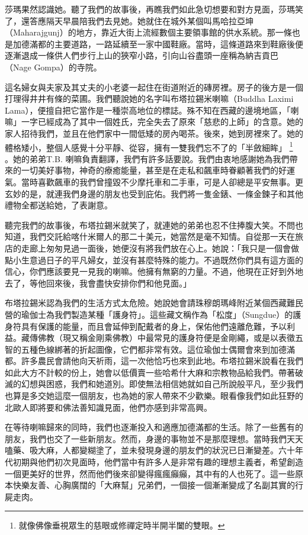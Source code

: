 莎瑪果然認識她。聽了我們的故事後，再瞧我們如此急切想要和對方見面，莎瑪笑了，還答應隔天早晨陪我們去見她。她就住在城外某個叫馬哈拉亞坤（Maharajgunj）的地方，靠近大街上流經數個主要領事館的供水系統。那一條也是加德滿都的主要道路，一路延續至一家中國鞋廠。當時，這條道路來到鞋廠後便逐漸退成一條供人們步行上山的狹窄小路，引向山谷盡頭一座稱為納吉貢巴（Nage
Gompa）的寺院。

這名婦女與夫家及其丈夫的小老婆一起住在街道附近的磚房裡。房子的後方是一個打理得井井有條的菜圃。我們聽說她的名字叫布塔拉錫米喇嘛（Buddha
Laximi
Lama），便擅自把它當作是一種崇高地位的標誌。殊不知在西藏的邊境地區，「喇嘛」一字已經成為了其中一個姓氏，完全失去了原來「慈悲的上師」的含意。她的家人招待我們，並且在他們家中一間低矮的房內喝茶。後來，她到房裡來了。她的體格矮小，整個人感覺十分平靜、從容，擁有一雙我們忘不了的「半斂細眸」%
\footnote{就像佛像垂視眾生的慈眼或修禪定時半開半闔的雙眼。}%
。她的弟弟T.B.
喇嘛負責翻譯，我們有許多話要說。我們由衷地感謝她為我們帶來的一切美好事物，神奇的療癒能量，甚至是在走私和飆車時眷顧著我們的好運氣。當時喜歡飆車的我們曾撞毀不少摩托車和二手車，可是人卻總是平安無事。更玄妙的是，就連我們身邊的朋友也受到庇佑。我們將一隻金錶、一條金鍊子和其他禮物全都送給她，了表謝意。


聽完我們的故事後，布塔拉錫米就笑了，就連她的弟弟也忍不住捧腹大笑。不問也知道，我們交託給喀什米爾人的那二十美元，她當然是毫不知情。自從那一天在旅店的走廊上匆匆見過一面後，她便沒有將我們放在心上。她說：「我只是一個會做點小生意過日子的平凡婦女，並沒有甚麼特殊的能力。不過既然你們具有這方面的信心，你們應該要見一見我的喇嘛。他擁有無窮的力量。不過，他現在正好到外地去了，等他回來後，我會盡快安排你們和他見面。」

布塔拉錫米認為我們的生活方式太危險。她說她會請珠穆朗瑪峰附近某個西藏難民營的瑜伽士為我們製造某種「護身符」。這些藏文稱作為「松度」（Sungdue）的護身符具有保護的能量，而且會延伸到配戴者的身上，保佑他們遠離危難，予以利益。藏傳佛教（現又稱金剛乘佛教）中最常見的護身符便是金剛繩，或是以表徵五智的五種色線綁著的折起圖像，它們都非常有效。這位瑜伽士偶爾會來到加德滿都。許多農民會請他向天祈雨，這一次他恰巧也來到此地。布塔拉錫米說看在我們如此大方不計較的份上，她會以低價賣一些哈希什大麻和宗教物品給我們。帶著破滅的幻想與困惑，我們和她道別。即使無法相信她就如自己所說般平凡，至少我們也算是多交她這麼一個朋友，也為她的家人帶來不少歡樂。眼看像我們如此狂野的北歐人即將要和佛法善知識見面，他們亦感到非常高興。

在等待喇嘛歸來的同時，我們也逐漸投入和適應加德滿都的生活。除了一些舊有的朋友，我們也交了一些新朋友。然而，身邊的事物並不是那麼理想。當時我們天天嗑藥、吸大麻，人都變糊塗了，並未發現身邊的朋友們的狀況已日漸變差。六十年代初期與他們初次見面時，他們當中有許多人是非常有趣的理想主義者，希望創造一個更美好的世界，然而他們後來卻變得瘋瘋癲癲，其中有的人也死了。這一些原本快樂友善、心胸廣闊的「大麻幫」兄弟們，一個接一個漸漸變成了名副其實的行屍走肉。

